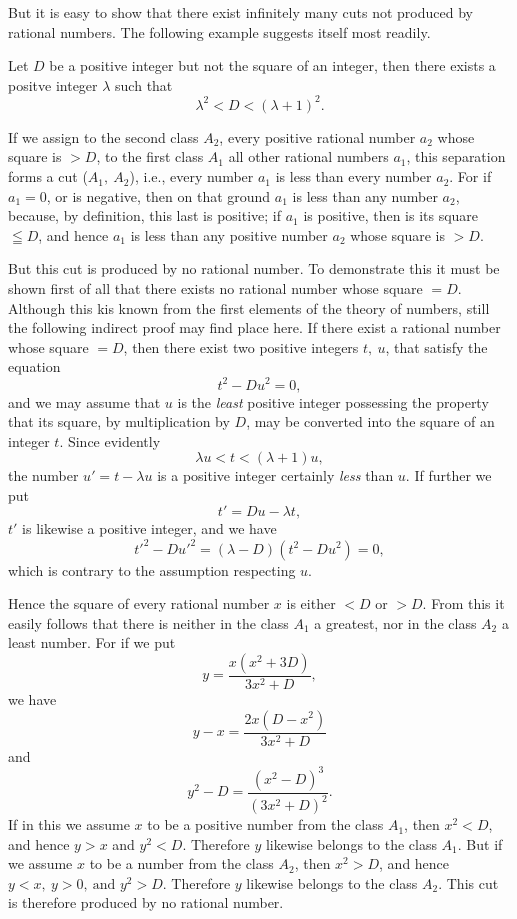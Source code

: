 \documentclass[oneside,12pt]{book}
\begin{document}
But it is easy to show that there exist infinitely many cuts not produced by rational numbers. The following example suggests itself most readily. \par 

Let $D$ be a positive integer but not the square of an integer, then there exists a positve integer $\lambda$ such that 
$$\lambda^2<D<(\lambda+1)^2.$$ \par 

If we assign to the second class $A_2$, every positive rational number $a_2$ whose square is $>D$, to the first class $A_1$ all other rational numbers $a_1$, this separation forms a cut ($A_1,\ A_2$), i.e., every number $a_1$ is less than every number $a_2$. For if $a_1=0$, or is negative, then on that ground $a_1$ is less than any number $a_2$, because, by definition, this last is positive; if $a_1$ is positive, then is its square $\leqq D$, and hence $a_1$ is less than any positive number $a_2$ whose square is $>D$. \par 

But this cut is produced by no rational number. To demonstrate this it must be shown first of all that there exists no rational number whose square $=D$. Although this kis known from the first elements of the theory of numbers, still the following indirect proof may find place here. If there exist a rational number whose square $=D$, then there exist two positive integers $t,\ u$, that satisfy the equation 
$$t^2-Du^2=0,$$
and we may assume that $u$ is the \textit{least} positive integer possessing the property that its square, by multiplication by $D$, may be converted into the square of an integer $t$. Since evidently
$$\lambda u<t<(\lambda +1)u,$$
the number $u'=t-\lambda u$ is a positive integer certainly \textit{less} than $u$. If further we put 
$$t'=Du-\lambda t,$$
$t'$ is likewise a positive integer, and we have
$$t'^2-Du'^2=(\lambda -D)(t^2-Du^2)=0,$$
which is contrary to the assumption respecting $u$. \par 

Hence the square of every rational number $x$ is either $<D$ or $>D$. From this it easily follows that there is neither in the class $A_1$ a greatest, nor in the class $A_2$ a least number. For if we put 
$$y=\frac{x(x^2+3D)}{3x^2+D},$$
we have
$$y-x=\frac{2x(D-x^2)}{3x^2+D}$$
and 
$$y^2-D=\frac{(x^2-D)^3}{(3x^2+D)^2}.$$
If in this we assume $x$ to be a positive number from the class $A_1$, then $x^2<D$, and hence $y>x$ and $y^2<D$. Therefore $y$ likewise belongs to the class $A_1$. But if we assume $x$ to be a number from the class $A_2$, then $x^2>D$, and hence $y<x,\ y>0,\ \text{and } y^2>D$. Therefore $y$ likewise belongs to the class $A_2$. This cut is therefore produced by no rational number. \par 
\end{document}
